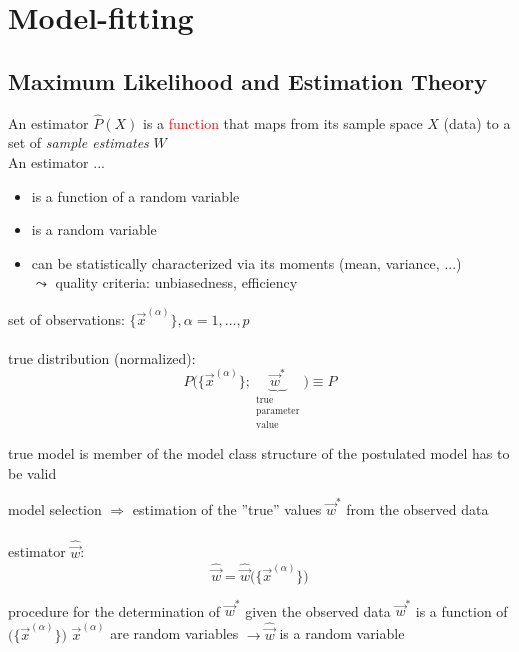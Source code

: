  
\section{Model-fitting}

\subsection{Maximum Likelihood and Estimation Theory}
An estimator $\hat{P}(X)$ is a \textcolor{red}{function} that maps from its sample space $X$ (data) to a set of \emph{sample estimates} $W$\\
An estimator ...
   \vspace{-0.1cm}
    \begin{itemize}
    \item is a function of a random variable
    \item is a random variable 
    \item can be statistically characterized via its moments
    (mean, variance, ...)\\ $\leadsto$ quality criteria: unbiasedness, efficiency
    \end{itemize}
set of observations: $\big\{ \vec{x}^{(\alpha)} \big\}, \alpha = 1, \ldots, p$
\\\\
true distribution (normalized): 
\begin{equation}
        P\big(\big\{\vec{x}^{(\alpha)}\big\};
                \underbrace{ \vec{w}^* }_{ \substack{ 
                        \text{true} \\ 
                        \text{parameter} \\ 
                        \text{value}}} \big) \equiv P 
\end{equation}
\begin{itemize}
        \itl true model is member of the model class
        \itl structure of the postulated model has to be valid
\end{itemize}
model selection $\Rightarrow$ estimation of the ''true'' values $\vec{w}^*$ from the observed data
\\\\
estimator $\widehat{\vec{w}}$:
\begin{equation}
        \widehat{\vec{w}} = \widehat{\vec{w}}
                \big(\big\{\vec{x}^{(\alpha)}\big\}\big)
\end{equation}
\begin{itemize}
        \itl procedure for the determination of $\vec{w}^*$ given the observed
                data
        \itl $\vec{w}^*$ is a function of $\big(\big\{ 
                \vec{x}^{(\alpha)}\big\}\big)$
        \itl $\vec{x}^{(\alpha)}$ are random variables $\rightarrow 
                \widehat{\vec{w}}$ is a random variable
\end{itemize}

